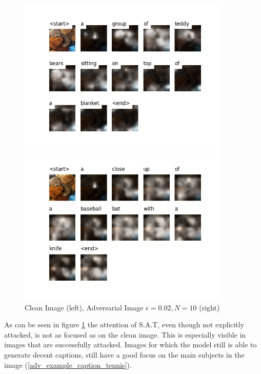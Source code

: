 \begin{figure}[h]
    \centering
    \begin{minipage}{0.45\textwidth}
        \centering
        \includegraphics[width=0.9\textwidth]{figures/caption_teddy_normal.png} %
    \end{minipage}\hfill
    \begin{minipage}{0.45\textwidth}
        \centering
        \includegraphics[width=0.9\textwidth]{figures/caption_adv_teddy_bear_0.02.png} %
    \end{minipage}
    \caption{Clean Image (left), Adversarial Image $\epsilon=0.02, N=10$ (right)}
    \label{adv_example_caption}
\end{figure}

As can be seen in figure \ref{adv_example_caption} the attention of S.A.T, even though not explicitly attacked, is not as focused as on the clean image. This is especially visible in images that are successfully attacked. Images for which the model still is able to generate decent captions, still have a good focus on the main subjects in the image (\ref{adv_example_caption_tennis}).



